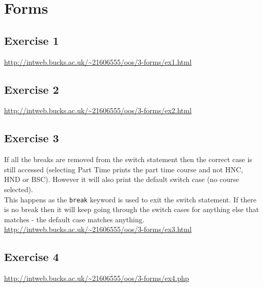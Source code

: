 \chapter{Forms}

\section{Exercise 1}

\url{http://intweb.bucks.ac.uk/~21606555/oos/3-forms/ex1.html}

\captionsetup{type=figure}


\captionsetup{type=figure}

\section{Exercise 2}

\url{http://intweb.bucks.ac.uk/~21606555/oos/3-forms/ex2.html}

\captionsetup{type=figure}


\captionsetup{type=figure}

\section{Exercise 3}

If all the breaks are removed from the switch statement then the correct case is still accessed (selecting Part Time prints the part time course and not HNC, HND or BSC). However it will also print the default switch case (no course selected).\\

This happens as the \texttt{break} keyword is used to exit the switch statement. If there is no break then it will keep going through the switch cases for anything else that matches - the default case matches anything.\\

\url{http://intweb.bucks.ac.uk/~21606555/oos/3-forms/ex3.html}

\captionsetup{type=figure}


\captionsetup{type=figure}

\section{Exercise 4}

\url{http://intweb.bucks.ac.uk/~21606555/oos/3-forms/ex4.php}

\captionsetup{type=figure}
